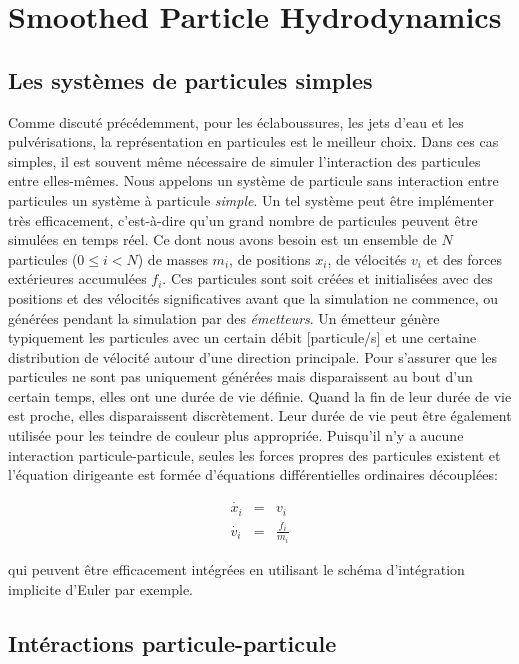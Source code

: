 \documentclass[11pt]{report}
\begin{document}
\chapter{Smoothed Particle Hydrodynamics}\label{chap:sph}

\section{Les systèmes de particules simples}

Comme discuté précédemment, pour les éclaboussures, les jets d'eau et les pulvérisations, la représentation en particules est le meilleur choix. Dans ces cas simples, il est souvent même nécessaire de simuler l'interaction des particules entre elles-mêmes. Nous appelons un système de particule sans interaction entre particules un système à particule \textit{simple}. Un tel système peut être implémenter très efficacement, c'est-à-dire qu'un grand nombre de particules peuvent être simulées en temps réel. Ce dont nous avons besoin est un ensemble de $N$ particules ($0 \leq i < N$) de masses $m_i$, de positions $x_i$, de vélocités $v_i$ et des forces extérieures accumulées $f_i$. Ces particules sont soit créées et initialisées avec des positions et des vélocités significatives avant que la simulation ne commence, ou générées pendant la simulation par des \textit{émetteurs}. Un émetteur génère typiquement les particules avec un certain débit [particule/s] et une certaine distribution de vélocité autour d'une direction principale. Pour s'assurer que les particules ne sont pas uniquement générées mais disparaissent au bout d'un certain  temps, elles ont une durée de vie définie. Quand la fin de leur durée de vie est proche, elles disparaissent discrètement. Leur durée de vie peut être également utilisée pour les teindre de couleur plus appropriée. Puisqu'il n'y a aucune interaction particule-particule, seules les forces propres des particules existent et l'équation dirigeante est formée d'équations différentielles ordinaires découplées:

\begin{eqnarray}
\dot{x_i} &=& v_i\\
\dot{v_i} &=& \frac{f_i}{m_i}
\end{eqnarray}

qui peuvent être efficacement intégrées en utilisant le schéma d'intégration implicite d'Euler par exemple.

\section{Intéractions particule-particule}
\end{document}
